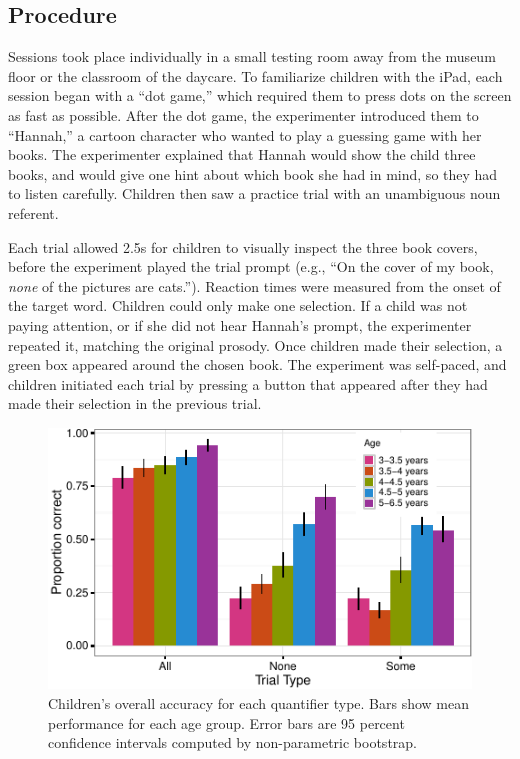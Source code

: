 \documentclass[10pt, letterpaper]{article}
\newenvironment{CodeChunk}{}{}
\begin{document}
\subsection{Procedure}\label{procedure}

Sessions took place individually in a small testing room away from the
museum floor or the classroom of the daycare. To familiarize children
with the iPad, each session began with a ``dot game,'' which required
them to press dots on the screen as fast as possible. After the dot
game, the experimenter introduced them to ``Hannah,'' a cartoon
character who wanted to play a guessing game with her books. The
experimenter explained that Hannah would show the child three books, and
would give one hint about which book she had in mind, so they had to
listen carefully. Children then saw a practice trial with an unambiguous
noun referent.

Each trial allowed 2.5s for children to visually inspect the three book
covers, before the experiment played the trial prompt (e.g., ``On the
cover of my book, \emph{none} of the pictures are cats.''). Reaction
times were measured from the onset of the target word. Children could
only make one selection. If a child was not paying attention, or if she
did not hear Hannah's prompt, the experimenter repeated it, matching the
original prosody. Once children made their selection, a green box
appeared around the chosen book. The experiment was self-paced, and
children initiated each trial by pressing a button that appeared after
they had made their selection in the previous trial.

\begin{CodeChunk}
\begin{figure}[t]
\includegraphics{figs/overall_acc-1} \caption[Children's overall accuracy for each quantifier type]{Children's overall accuracy for each quantifier type. Bars show mean performance for each age group. Error bars are 95 percent confidence intervals computed by non-parametric bootstrap.}\label{fig:overall_acc}
\end{figure}
\end{CodeChunk}
\end{document}
